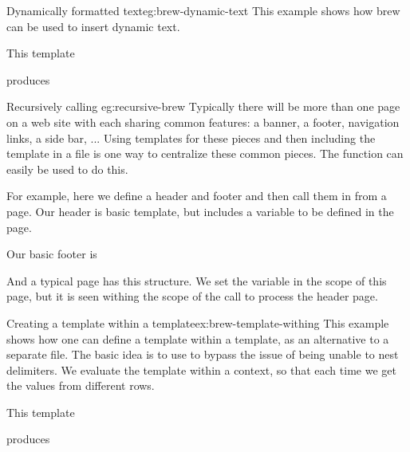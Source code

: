 \begin{example}{Dynamically formatted text}{eg:brew-dynamic-text}
  This example shows how brew can be used to insert dynamic text.

This template


produces


\end{example}

\begin{example}{Recursively calling }{eg:recursive-brew}
  Typically there will be more than one page on a web site with each
  sharing common features: a banner, a footer, navigation links, a
  side bar, ... Using templates for these pieces and then including
  the template in a file is one way to centralize these common
  pieces. The  function can easily be used to do this.
  
  For example, here we define a header and footer and then call them
  in from a page. Our header is basic template, but includes a
  variable  to be defined in the page.
  

  Our basic footer is
  

  And a typical page has this structure. We set the variable
   in the scope of this page, but it is seen withing the
  scope of the call to process the header page.
  
  
  
\end{example}


\begin{example}{Creating a template within a template}{ex:brew-template-withing}
  This example shows how one can define a template within a template,
  as an alternative to a separate file. The basic idea is to use
   to bypass the issue of being unable to nest
   delimiters. We evaluate the template within a context, so
  that each time we get the values from different rows.

This template

 produces
 
\end{example}

